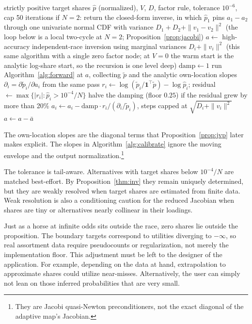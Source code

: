 \documentclass[12pt]{article}
\theoremstyle{remark}
\begin{document}
\begin{algorithm}[H]
\caption{Calibration (damped Jacobi quasi-Newton)}
\label{alg:calibrate}
\begin{algorithmic}[1]
\Require strictly positive target shares $\hat p$ (normalized), $V$, $D$,
factor rule, tolerance $10^{-6}$, cap 50 iterations
\State if $N = 2$: return the closed-form inverse, in which $\hat p_1$
pins $a_1 - a_2$ through one univariate normal CDF with variance $D_1 +
D_2 + \|v_1 - v_2\|^2$ (the loop below is a local two-cycle at $N = 2$;
Proposition~\ref{prop:jacobi})
\State $a \gets$ high-accuracy independent-race inversion using
marginal variances $D_i + \|v_i\|^2$ (this same algorithm with a
single zero factor node; at $V = 0$ the warm start is the analytic
log-share start, so the recursion is one level deep) 
\State $\mathrm{damp} \gets 1$
\Repeat
  \State run Algorithm~\ref{alg:forward} at $a$, collecting $\tilde p$
  and the analytic own-location slopes $\partial_i = \partial \tilde
  p_i / \partial a_i$ from the same pass
  \State $r_i \gets \log(\tilde p_i / \mathbf{1}^\top \tilde p) -
  \log \hat p_i$; residual $\gets \max\{|r_i| : \hat p_i >
  10^{-4}/N\}$
  \State halve the damping (floor $0.25$) if the residual grew by more
  than 20\%
  \State $a_i \gets a_i - \mathrm{damp} \cdot r_i / (\partial_i /
  \tilde p_i)$, steps capped at $\sqrt{D_i + \|v_i\|^2}$
  \State $a \gets a - \bar a$ 
\end{algorithmic}
\end{algorithm}

The own-location slopes are the diagonal terms that
Proposition~\ref{prop:jvp} later makes explicit. The slopes in
Algorithm~\ref{alg:calibrate} ignore the moving envelope and the output
normalization.\footnote{They are Jacobi quasi-Newton preconditioners,
not the exact diagonal of the adaptive map's Jacobian.}

The tolerance is tail-aware. Alternatives with target shares below
$10^{-4}/N$ are matched best-effort. By Proposition~\ref{thm:inv} they
remain uniquely determined, but they are weakly resolved when target
shares are estimated from finite data.
Weak resolution is also a conditioning caution for the reduced
Jacobian when shares are tiny or alternatives nearly collinear in their
loadings.

Just as a horse at infinite odds sits outside the race, zero shares lie outside the proposition. The boundary targets
correspond to utilities diverging to $-\infty$, so real assortment data
require pseudocounts or regularization, not merely the implementation
floor. This adjustment must be left to the designer of the application. For example, depending
on the data at hand, extrapolation to approximate shares could utilize near-misses. Alternatively, the user can
simply not lean on those inferred probabilities that are very small. 
\end{document}
